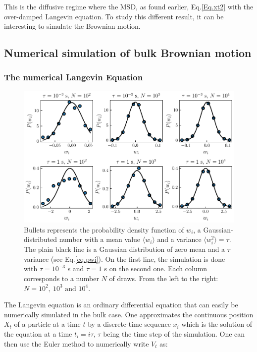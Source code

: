 This is the diffusive regime where the \gls{MSD}, as found earlier, Eq.\ref{Eq.xt2} with the over-damped Langevin equation. To study this different result, it can be interesting to simulate the Brownian motion.

\subsection{Numerical simulation of bulk Brownian motion}

\subsubsection{The numerical Langevin Equation}

\begin{figure}[!hb]
	\centering
	\includegraphics{02_body/chapter1/image/noise_simulation/exemple.pdf}
	\caption{Bullets represents the probability density function of $w_i$, a Gaussian-distributed number with a mean value $\langle w_i \rangle$ and a variance $\langle w_i ^2 \rangle  = \tau$. The plain black line is a Gaussian distribution of zero mean and a $\tau$ variance (see Eq.\ref{eq.pwi}). On the first line, the simulation is done with $\tau = 10^{-3}$ s and $\tau = 1$ s on the second one. Each column corresponds to a number $N$ of draws. From the left to the right: $N=10^2, ~10^3 \text{ and } 10^4$. }
	\label{fig:exempleprecisionwi}
\end{figure}


The Langevin equation is an ordinary differential equation that can easily be numerically simulated in the bulk case. One approximates the continuous position $X_t$ of a particle at a time $t$ by a discrete-time sequence $x_i$ which is the solution of the equation at a time $t_i = i  \tau$, $\tau$ being the time step of the simulation. One can then use the Euler method to numerically write $V_t$ as:

